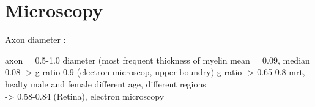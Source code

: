 \section{Microscopy}
% 
Axon diameter \cite{Liewald2014}:
% 
\begin{table}[!b]
\centering
{}
\caption{axon diameter distribution of the human brain in \si{\micro\meter} \cite{Liewald2014}}
\end{table}
axon = 0.5-1.0 diameter (most frequent
thickness of myelin mean = 0.09, median 0.08
-> g-ratio 0.9 (electron microscop, upper boundry)
% 
g-ratio
\cite{Cercignani2017} -> 0.65-0.8 mrt, healty male and female different age, different regions\\
\cite{FitzGibbon2013} -> 0.58-0.84 (Retina), electron microscopy
